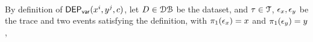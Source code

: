 \\
%
By definition of $\mathsf{DEP_{var}}(x^i, y^j, {c})$, 
let $D \in \mathcal{DB}$ be the dataset,
and $\mathtt{\tau} \in \mathcal{T}$, $\mathtt{\epsilon}_x, \mathtt{\epsilon}_y$ be the trace and two events satisfying the definition, 
with $\pi_1(\mathtt{\epsilon}_x) = x$ and $\pi_1(\mathtt{\epsilon}_y) = y$,

